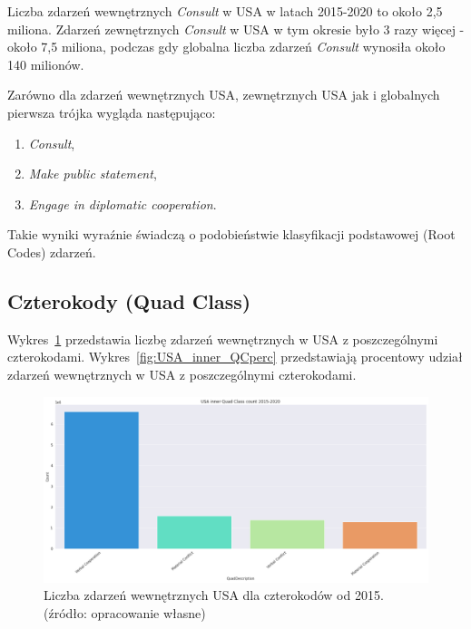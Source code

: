 \documentclass[11pt]{report}
\begin{document}
    Liczba zdarzeń wewnętrznych \textit{Consult} w USA w latach 2015-2020 to około 2,5 miliona.
    Zdarzeń zewnętrznych \textit{Consult} w USA w tym okresie było 3 razy więcej - około 7,5 miliona,
    podczas gdy globalna liczba zdarzeń \textit{Consult} wynosiła około 140 milionów.

    Zarówno dla zdarzeń wewnętrznych USA, zewnętrznych USA jak i globalnych pierwsza trójka wygląda następująco:
    \begin{enumerate}
        \item \textit{Consult},
        \item \textit{Make public statement},
        \item \textit{Engage in diplomatic cooperation}.
    \end{enumerate}

    Takie wyniki wyraźnie świadczą o podobieństwie klasyfikacji podstawowej (Root Codes) zdarzeń.

    \subsection{Czterokody (Quad Class)}

    Wykres~\ref{fig:USA_inner_QC} przedstawia liczbę zdarzeń wewnętrznych w USA z poszczególnymi czterokodami.
    Wykres~\ref{fig:USA_inner_QCperc} przedstawiają procentowy udział zdarzeń wewnętrznych w USA z poszczególnymi czterokodami.

    \begin{figure}[!htp]
        \centering
        \includegraphics[width=\linewidth]{fig/USA inner/QC.png}
        \caption{Liczba zdarzeń wewnętrznych USA dla czterokodów od 2015. (źródło: opracowanie własne)}
        \label{fig:USA_inner_QC}
    \end{figure}
\end{document}
